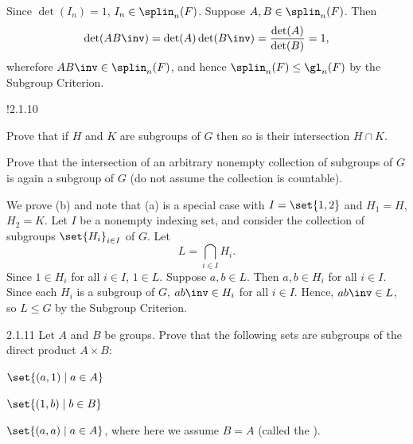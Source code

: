 \begin{sol}
    Since $\det(I_n) = 1$, $I_n \in \splin_n(F)$.
	Suppose $A, B \in \splin_n(F)$.
	Then
    \[
    	\det(AB\inv) = \det(A)\det(B\inv) = \frac{\det(A)}{\det(B)} = 1,
    \]
    wherefore $AB\inv \in \splin_n(F)$, and hence $\splin_n(F) \leq \gl_n(F)$ by the Subgroup Criterion.
\end{sol}

\begin{exercise}!{2.1.10}
    \begin{subexercises}
        \item Prove that if $H$ and $K$ are subgroups of $G$ then so is their intersection $H \cap K$.
        \item Prove that the intersection of an arbitrary nonempty collection of subgroups of $G$ is again a subgroup of $G$ (do not assume the collection is countable).
    \end{subexercises}
\end{exercise}

\begin{sol}
    We prove (b) and note that (a) is a special case with $I = \set{1, 2}$ and $H_1 = H$, $H_2 = K$.
	Let $I$ be a nonempty indexing set, and consider the collection of subgroups $\set{ H_i }_{i \in I}$ of $G$.
	Let
    \[
    	L = \bigcap_{i \in I} H_i.
    \]
    Since $1 \in H_i$ for all $i \in I$, $1 \in L$.
	Suppose $a, b \in L$.
	Then $a, b \in H_i$ for all $i \in I$.
	Since each $H_i$ is a subgroup of $G$, $ab\inv \in H_i$ for all $i \in I$.
	Hence, $ab\inv \in L$, so $L \leq G$ by the Subgroup Criterion.
\end{sol}

\begin{exercise}{2.1.11}
    Let $A$ and $B$ be groups.
	Prove that the following sets are subgroups of the direct product $A \times B$:
    \begin{subexercises}
        \item $\set{ (a, 1) \mid a \in A }$
        \item $\set{ (1, b) \mid b \in B }$
        \item $\set{ (a, a) \mid a \in A }$, where here we assume $B = A$ (called the ).
    \end{subexercises}
\end{exercise}

